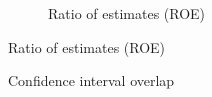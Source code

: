 \begin{figure}[ht]
    \begin{subfigure}{\textwidth}
        \centering        
        \caption{Ratio of estimates (ROE)}
        \label{subfig:graph_compare_roe}
    \end{subfigure}
\end{figure}

\begin{figure}
    \caption{Confidence interval overlap}
    \label{fig:utility_compare_cio}
\end{figure}
